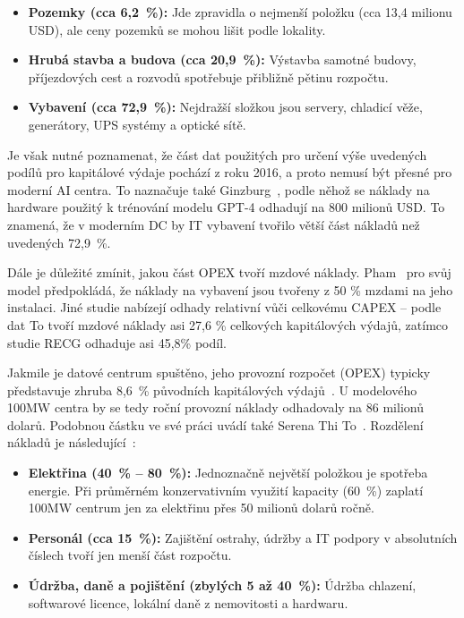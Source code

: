 \begin{itemize}
    \item \textbf{Pozemky (cca 6,2~\%):} Jde zpravidla o nejmenší položku (cca 13,4 milionu USD), ale ceny pozemků se mohou lišit podle lokality.
    
    \item \textbf{Hrubá stavba a budova (cca 20,9~\%):} Výstavba samotné budovy, příjezdových cest a rozvodů spotřebuje přibližně pětinu rozpočtu.
    
    \item \textbf{Vybavení (cca 72,9~\%):} Nejdražší složkou jsou servery, chladicí věže, generátory, UPS systémy a optické sítě.
\end{itemize}

Je však nutné poznamenat, že část dat použitých pro určení výše uvedených podílů pro kapitálové výdaje pochází z roku 2016, a proto nemusí být přesné pro moderní AI centra. To naznačuje také Ginzburg~\cite[s.~18]{ginzburg-ganz_technical_2025}, podle něhož se náklady na hardware použitý k trénování modelu GPT-4 odhadují na 800 milionů USD. To znamená, že v moderním DC by IT vybavení tvořilo větší část nákladů než uvedených 72,9~\%.

Dále je důležité zmínit, jakou část OPEX tvoří mzdové náklady. Pham~\cite[s.~11]{pham_data_2017} pro svůj model předpokládá, že náklady na vybavení jsou tvořeny z 50 \% mzdami na jeho instalaci. Jiné studie nabízejí odhady relativní vůči celkovému CAPEX -- podle dat To \cite[s.~6]{to_albertas_2025} tvoří mzdové náklady asi 27,6 \% celkových kapitálových výdajů, zatímco studie RECG \cite[s.~14]{diao_economic_2025} odhaduje asi 45,8\% podíl.

Jakmile je datové centrum spuštěno, jeho provozní rozpočet (OPEX) typicky představuje zhruba 8,6~\% původních kapitálových výdajů~\cite[s.~9]{pham_data_2017}. U modelového 100MW centra by se tedy roční provozní náklady odhadovaly na 86 milionů dolarů. Podobnou částku ve své práci uvádí také Serena Thi To~\cite[s.~9]{to_albertas_2025}. Rozdělení nákladů je následující~\cite[s.~9]{pham_data_2017}:

\begin{itemize}
    \item \textbf{Elektřina (40~\% -- 80~\%):} Jednoznačně největší položkou je spotřeba energie. Při průměrném konzervativním využití kapacity (60~\%) zaplatí 100MW centrum jen za elektřinu přes 50 milionů dolarů ročně.

    \item \textbf{Personál (cca 15~\%):} Zajištění ostrahy, údržby a IT podpory v absolutních číslech tvoří jen menší část rozpočtu.
    
    \item \textbf{Údržba, daně a pojištění (zbylých 5 až 40~\%):} Údržba chlazení, softwarové licence, lokální daně z nemovitosti a hardwaru.
\end{itemize}

